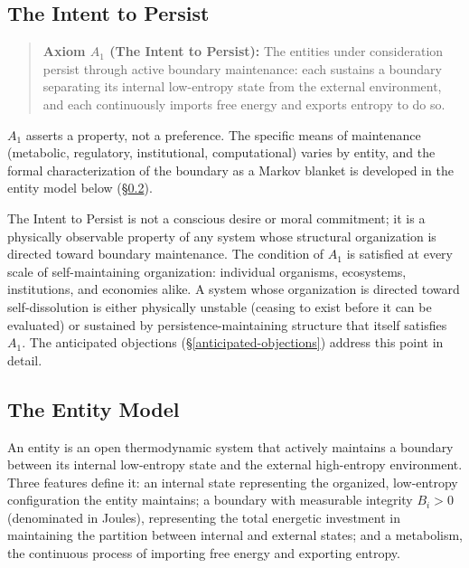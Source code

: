 \documentclass[11pt]{article}
\theoremstyle{plain}
\theoremstyle{definition}
\theoremstyle{remark}
\let\origsubsection\subsection
\renewcommand{\subsection}{\needspace{7\baselineskip}\origsubsection}
\begin{document}
\subsection{The Intent to Persist}\label{the-intent-to-persist}

\begin{quote}
\textbf{Axiom \(A_1\) (The Intent to Persist):} The entities under
consideration persist through active boundary maintenance: each sustains
a boundary separating its internal low-entropy state from the external
environment, and each continuously imports free energy and exports
entropy to do so.
\end{quote}

\(A_1\) asserts a property, not a preference. The specific means of
maintenance (metabolic, regulatory, institutional, computational) varies
by entity, and the formal characterization of the boundary as a Markov
blanket \citep{Pearl2000, Friston2013} is developed in the entity model
below (§\ref{the-entity-model}).

The Intent to Persist is not a conscious desire or moral commitment; it
is a physically observable property of any system whose structural
organization is directed toward boundary maintenance. The condition of
\(A_1\) is satisfied at every scale of self-maintaining organization:
individual organisms, ecosystems, institutions, and economies alike. A
system whose organization is directed toward self-dissolution is either
physically unstable (ceasing to exist before it can be evaluated) or
sustained by persistence-maintaining structure that itself satisfies
\(A_1\). The anticipated objections (§\ref{anticipated-objections})
address this point in detail.

\subsection{The Entity Model}\label{the-entity-model}

An entity is an open thermodynamic system that actively maintains a
boundary between its internal low-entropy state and the external
high-entropy environment. Three features define it: an internal state
representing the organized, low-entropy configuration the entity
maintains; a boundary with measurable integrity \(B_i > 0\) (denominated
in Joules), representing the total energetic investment in maintaining
the partition between internal and external states; and a metabolism,
the continuous process of importing free energy and exporting entropy.
\end{document}
